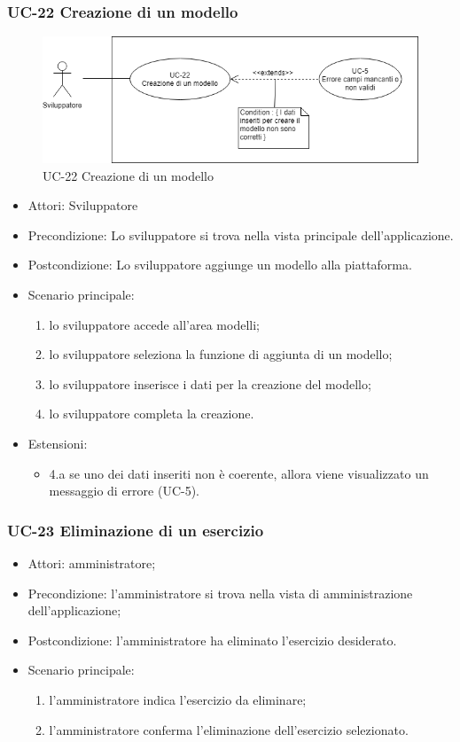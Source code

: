 	\subsubsection{UC-22 Creazione di un modello}
		\begin{figure}[h]
			\centering
			\includegraphics[scale=0.7]{images/UC-22.png}
				\caption{UC-22 Creazione di un modello}
		\end{figure}			
		\begin{itemize}
			\item Attori: Sviluppatore
			\item Precondizione: Lo sviluppatore si trova nella vista principale dell'applicazione.
			\item Postcondizione: Lo sviluppatore aggiunge un modello alla piattaforma.
			\item Scenario principale:
			\begin{enumerate}
				\item lo sviluppatore accede all'area modelli;
				\item lo sviluppatore seleziona la funzione di aggiunta di un modello;
				\item lo sviluppatore inserisce i dati per la creazione del modello;
				\item lo sviluppatore completa la creazione.
			\end{enumerate}
			\item Estensioni:
				\begin{itemize}
					\item 4.a se uno dei dati inseriti non è coerente, allora viene visualizzato un messaggio di errore (UC-5).
				\end{itemize}
		\end{itemize}
	\subsubsection{UC-23 Eliminazione di un esercizio}
			\begin{itemize}
			\item Attori: amministratore;
			\item Precondizione: l'amministratore si trova nella vista di amministrazione dell'applicazione;
			\item Postcondizione: l'amministratore ha eliminato l'esercizio desiderato.
			\item Scenario principale:
				\begin{enumerate}
					\item l'amministratore indica l'esercizio da eliminare;
					\item l'amministratore conferma l'eliminazione dell'esercizio selezionato.
				\end{enumerate}
		\end{itemize}